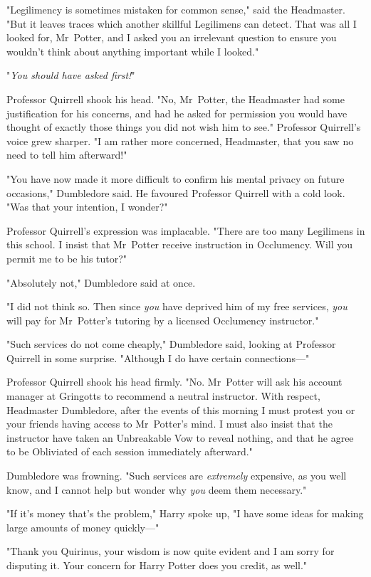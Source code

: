 "Legilimency is sometimes mistaken for common sense," said the Headmaster. "But
it leaves traces which another skillful Legilimens can detect. That was all I
looked for, Mr~Potter, and I asked you an irrelevant question to ensure you
wouldn't think about anything important while I looked."

"\emph{You should have asked first!}"

Professor Quirrell shook his head. "No, Mr~Potter, the Headmaster had some
justification for his concerns, and had he asked for permission you would have
thought of exactly those things you did not wish him to see." Professor
Quirrell's voice grew sharper. "I am rather more concerned, Headmaster, that
you saw no need to tell him afterward!"

"You have now made it more difficult to confirm his mental privacy on future
occasions," Dumbledore said. He favoured Professor Quirrell with a cold look.
"Was that your intention, I wonder?"

Professor Quirrell's expression was implacable. "There are too many Legilimens
in this school. I insist that Mr~Potter receive instruction in Occlumency.
Will you permit me to be his tutor?"

"Absolutely not," Dumbledore said at once.

"I did not think so. Then since \emph{you} have deprived him of my free
services, \emph{you} will pay for Mr~Potter's tutoring by a licensed
Occlumency instructor."

"Such services do not come cheaply," Dumbledore said, looking at Professor
Quirrell in some surprise. "Although I do have certain connections—"

Professor Quirrell shook his head firmly. "No. Mr~Potter will ask his account
manager at Gringotts to recommend a neutral instructor. With respect,
Headmaster Dumbledore, after the events of this morning I must protest you or
your friends having access to Mr~Potter's mind. I must also insist that the
instructor have taken an Unbreakable Vow to reveal nothing, and that he agree
to be Obliviated of each session immediately afterward."

Dumbledore was frowning. "Such services are \emph{extremely} expensive, as you
well know, and I cannot help but wonder why \emph{you} deem them necessary."

"If it's money that's the problem," Harry spoke up, "I have some ideas for
making large amounts of money quickly—"

"Thank you Quirinus, your wisdom is now quite evident and I am sorry for
disputing it. Your concern for Harry Potter does you credit, as well."

